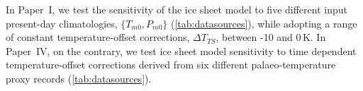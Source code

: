 \documentclass[a4paper]{kappa}
\newcommand{\degree}[0]{\ensuremath{^{\circ}}}
\newcommand{\CCLI}[0]{Paper~I}      %
\newcommand{\CCYC}[0]{Paper~IV}     %
\begin{document}
In \CCLI, we test the sensitivity of the ice sheet model to five different
input present-day climatologies, $\{T_{m0}, P_{m0}\}$ (\cref{tab:datasources}),
while adopting a range of constant temperature-offset corrections,
${\Delta}T_{TS}$, between -10 and 0\,K. In \CCYC, on the contrary, we test ice
sheet model sensitivity to time dependent temperature-offset corrections
derived from six different palaeo-temperature proxy records
(\cref{tab:datasources}).




\end{document}
